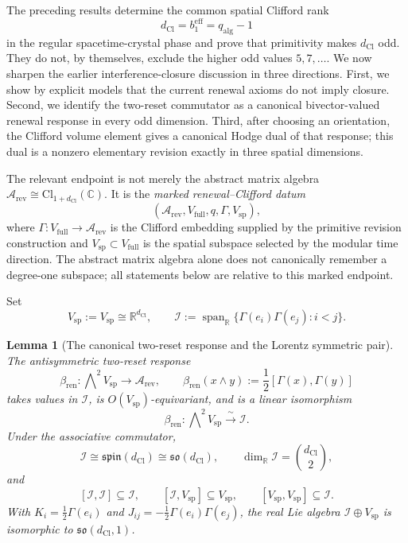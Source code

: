 \documentclass[11pt]{article}
\newtheorem{lemma}[theorem]{Lemma}
\theoremstyle{definition}
\theoremstyle{remark}
\newcommand{\R}{\mathbb{R}}
\newcommand{\C}{\mathbb{C}}
\newcommand{\Arev}{\mathcal{A}_{\mathrm{rev}}}
\newcommand{\Cl}{\mathrm{Cl}}
\newcommand{\dCl}{d_{\mathrm{Cl}}}
\newcommand{\beff}{b_1^{\mathrm{eff}}}
\newcommand{\Vsp}{V_{\mathrm{sp}}}
\newcommand{\Iint}{\mathcal{I}}
\newcommand{\bren}{\beta_{\mathrm{ren}}}
\begin{document}
The preceding results determine the common spatial Clifford rank
\[
  \dCl=\beff=q_{\mathrm{alg}}-1
\]
in the regular spacetime-crystal phase and prove that primitivity makes
\(\dCl\) odd. They do not, by themselves, exclude the higher odd values
\(5,7,\ldots\). We now sharpen the earlier interference-closure discussion in
three directions. First, we show by explicit models that the current renewal
axioms do not imply closure. Second, we identify the two-reset commutator as a
canonical bivector-valued renewal response in every odd dimension. Third, after
choosing an orientation, the Clifford volume element gives a canonical Hodge
dual of that response; this dual is a nonzero elementary revision exactly in
three spatial dimensions.

The relevant endpoint is not merely the abstract matrix algebra
\(\Arev\cong\Cl_{1+\dCl}(\C)\). It is the \emph{marked renewal--Clifford datum}
\[
  (\Arev,V_{\mathrm{full}},q,\Gamma,V_{\mathrm{sp}}),
\]
where \(\Gamma:V_{\mathrm{full}}\to\Arev\) is the Clifford embedding supplied by
the primitive revision construction and \(V_{\mathrm{sp}}\subset
V_{\mathrm{full}}\) is the spatial subspace selected by the modular time
direction. The abstract matrix algebra alone does not canonically remember a
degree-one subspace; all statements below are relative to this marked endpoint.

Set
\[
  \Vsp:=V_{\mathrm{sp}}\cong\R^{\dCl},
  \qquad
  \Iint:=\operatorname{span}_{\R}
  \{\Gamma(e_i)\Gamma(e_j):i<j\}.
\]

\begin{lemma}[The canonical two-reset response and the Lorentz symmetric pair]
\label{lem:interference-lorentz-pair}
The antisymmetric two-reset response
\[
  \bren:\bigwedge\nolimits^2\Vsp\longrightarrow\Arev,
  \qquad
  \bren(x\wedge y):=\frac12[\Gamma(x),\Gamma(y)]
\]
takes values in \(\Iint\), is \(O(\Vsp)\)-equivariant, and is a linear
isomorphism
\[
  \bren:\bigwedge\nolimits^2\Vsp\xrightarrow{\ \sim\ }\Iint.
\]
Under the associative commutator,
\[
  \Iint\cong\mathfrak{spin}(\dCl)\cong\mathfrak{so}(\dCl),
  \qquad
  \dim_{\R}\Iint=\binom{\dCl}{2},
\]
and
\[
  [\Iint,\Iint]\subseteq\Iint,\qquad
  [\Iint,\Vsp]\subseteq\Vsp,\qquad
  [\Vsp,\Vsp]\subseteq\Iint.
\]
With \(K_i=\frac12\Gamma(e_i)\) and
\(J_{ij}=-\frac12\Gamma(e_i)\Gamma(e_j)\), the real Lie algebra
\(\Iint\oplus\Vsp\) is isomorphic to \(\mathfrak{so}(\dCl,1)\).
\end{lemma}
\end{document}
